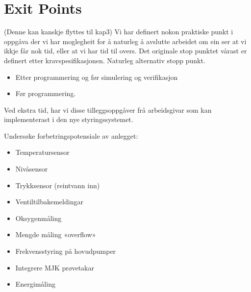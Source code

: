 \section{Exit Points}
\thispagestyle{fancy}
(Denne kan kanskje flyttes til kap3)
Vi har definert nokon praktiske punkt i oppgåva der vi har moglegheit 
for å naturleg å avslutte arbeidet om ein ser at vi ikkje får nok tid,
eller at vi har tid til overs. 
Det originale stop punktet vårast er definert etter kravspesifikasjonen. Naturleg alternativ stopp punkt.

\begin{itemize}
    \item Etter programmering og før simulering og verifikasjon
    \item Før programmering.
\end{itemize}

Ved ekstra tid, har vi disse tilleggsoppgåver frå arbeidsgivar 
som kan implementerast i den nye styringssystemet.

Undersøke forbetringspotensiale av anlegget:
\begin{itemize}
    \item Temperatursensor
    \item Nivåsensor
    \item Trykksensor (reintvann inn)
    \item Ventiltilbakemeldingar
    \item Oksygenmåling
    \item Mengde måling «overflow»
    \item Frekvensstyring på hovudpumper
    \item Integrere MJK prøvetakar
    \item Energimåling
\end{itemize}